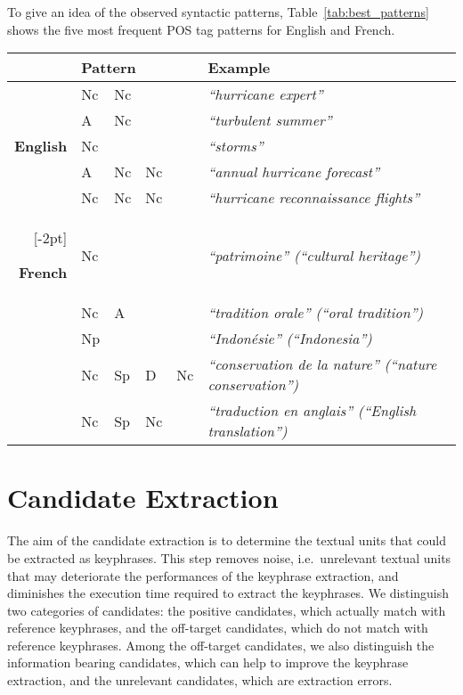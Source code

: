     To give an idea of the observed syntactic patterns,
    Table~\ref{tab:best_patterns} shows the five most frequent POS tag patterns
    for English and French.
    \begin{table*}
      \centering
      \begin{tabular}{rlllll}
        \toprule
        & \multicolumn{4}{l}{\textbf{Pattern}} & \textbf{Example}\\
        \midrule
        \multirow{5}{*}[-2pt]{\begin{sideways}\textbf{English}\end{sideways}} & Nc & Nc & & & \textit{``hurricane expert''}\\ %
        & A & Nc & & & \textit{``turbulent summer''}\\ %
        & Nc & & & & \textit{``storms''}\\ %
        & A & Nc & Nc & & \textit{``annual hurricane forecast''}\\ %
        & Nc & Nc & Nc & & \textit{``hurricane reconnaissance flights''}\\ %
        \addlinespace[1.5\defaultaddspace]
        \multirow{5}{*}[-2pt]{\begin{sideways}\textbf{French}\end{sideways}} & Nc & & & & \textit{``patrimoine'' (``cultural heritage'')}\\ %
        & Nc & A & & & \textit{``tradition orale'' (``oral tradition'')}\\ %
        & Np & & & & \textit{``Indonésie'' (``Indonesia'')}\\ %
        & Nc & Sp & D & Nc & \textit{``conservation de la nature'' (``nature conservation'')}\\ %
        & Nc & Sp & Nc & & \textit{``traduction en anglais'' (``English translation'')}\\ %
        \bottomrule
      \end{tabular}
      \caption{Frequent part-of-speech patterns (Multex format) for English and
               French keyphrases. \label{tab:best_patterns}}
    \end{table*}

\section{Candidate Extraction}
\label{sec:candidate_extraction}
  The aim of the candidate extraction is to determine the textual units that
  could be extracted as keyphrases. This step removes noise, i.e.~unrelevant
  textual units that may deteriorate the performances of the keyphrase
  extraction, and diminishes the execution time required to extract the
  keyphrases. We distinguish two categories of candidates: the positive
  candidates, which actually match with reference keyphrases, and the off-target
  candidates, which do not match with reference keyphrases. Among the off-target
  candidates, we also distinguish the information bearing candidates, which can
  help to improve the keyphrase extraction, and the unrelevant candidates, which
  are extraction errors.

